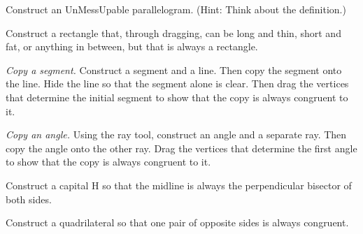 \begin{prob}
Construct an UnMessUpable parallelogram.  (Hint:  Think about the definition.)  
\end{prob}

\begin{prob}
Construct a rectangle that, through dragging, can be long and thin, short and fat, or anything in between, but that is always a rectangle.
\end{prob}

\begin{prob}
\emph{Copy a segment.}  Construct a segment and a line.  Then copy the segment onto the line.  Hide the line so that the segment alone is clear.  Then drag the vertices that determine the initial segment to show that the copy is always congruent to it.  
\end{prob}

\begin{prob}
\emph{Copy an angle.}  Using the ray tool, construct an angle and a separate ray.  Then copy the angle onto the other ray.  Drag the vertices that determine the first angle to show that the copy is always congruent to it.  
\end{prob}

\begin{prob}
Construct a capital H so that the midline is always the perpendicular bisector of both sides.  
\end{prob}

\begin{prob}
Construct a quadrilateral so that one pair of opposite sides is always congruent.  
\end{prob}






